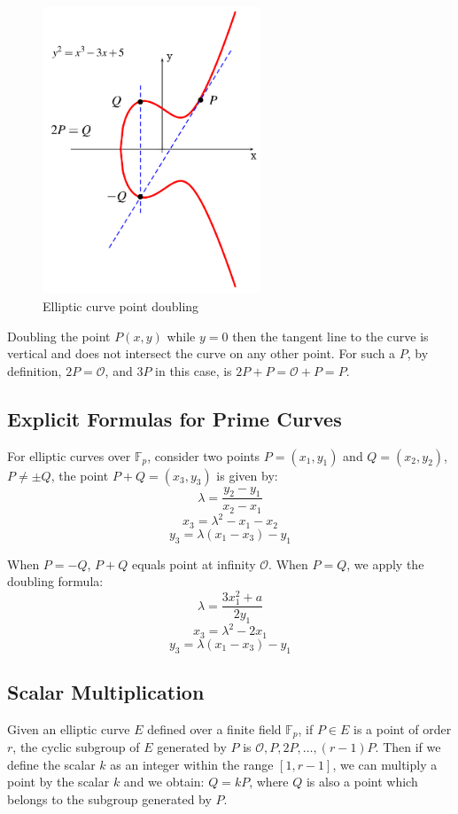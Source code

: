     \begin{figure}[h!]
    	\centering
    	\includegraphics[width=65mm]{./pics/ecc_point_doubling.png}
    	\caption[Elliptic curve point doubling]{Elliptic curve point doubling \cite{ECCPic}}
    	\label{fig:ecc_point_doubling}
    \end{figure}
    
Doubling the point $P(x,y)$ while $ y=0 $ then the tangent line to the curve is vertical and does not intersect the curve on any other point. For such a $P$, by definition, $2P=\mathcal{O}$, and $3P$ in this case, is $2P+P = \mathcal{O} + P = P$.   

\subsection*{Explicit Formulas for Prime Curves} \label{sec:affine_formulas}
For elliptic curves over $\mathbb{F}_p$, consider two points $P=(x_1,y_1)$ and $Q=(x_2,y_2)$, $P \neq \pm Q$, the point $P+Q = (x_3,y_3)$ is given by:
$$\lambda = \frac{y_2-y_1}{x_2-x_1}$$
$$x_3=\lambda^2-x_1-x_2$$
$$y_3=\lambda(x_1-x_3)-y_1$$

When $P=-Q$, $P+Q$ equals point at infinity $\mathcal{O}$. When $P=Q$, we apply the doubling formula:
$$\lambda = \frac{3x_1^2+a}{2y_1}$$
$$x_3=\lambda^2-2x_1$$
$$y_3=\lambda(x_1-x_3)-y_1$$



\subsection*{Scalar Multiplication}
Given an elliptic curve $E$ defined over a finite field $\mathbb{F}_p$, if $P \in E$ is a point of order $r$, the cyclic subgroup of $E$ generated by $P$ is ${\mathcal{O},P,2P,\ldots,(r-1)P}$. Then if we define the scalar $k$ as an integer within the range $[1,r-1]$, we can multiply a point by the scalar $k$ and we obtain: $Q=kP$, where $Q$ is also a point which belongs to the subgroup generated by $P$. 

